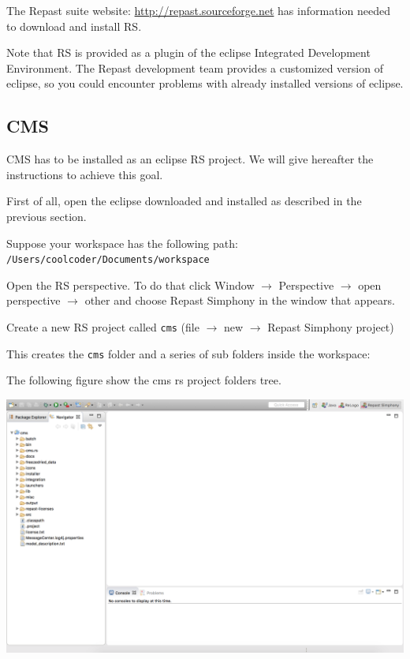 \documentclass{article}
\begin{document}
The Repast suite website: \url{http://repast.sourceforge.net} has information needed to download and install RS.

Note that RS is provided as a plugin of the eclipse Integrated Development Environment. The Repast development team provides a customized version of eclipse, so you could encounter problems with already installed versions of eclipse. 

\subsection{CMS}

CMS has to be installed as an eclipse RS project. We will give hereafter the instructions to achieve this goal.

First of all, open the eclipse downloaded and installed as described in the previous section.

Suppose your workspace has the following path:\\
\verb+/Users/coolcoder/Documents/workspace+

Open the RS perspective. To do that click Window $\rightarrow$ Perspective $\rightarrow$ open perspective $\rightarrow$ other and choose Repast Simphony in the window that appears.

Create a new RS project called \verb+cms+ (file $\rightarrow$ new $\rightarrow$ Repast Simphony project)

This creates the \verb+cms+ folder and a series of sub folders inside the workspace:

The following figure show the cms rs project folders tree.

\vskip2mm
\noindent
\includegraphics[scale=0.35]{fig_cms_rs_navigation}
\end{document}

